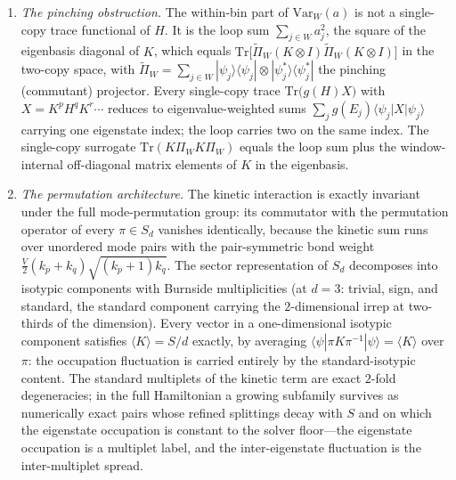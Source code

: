 \begin{proposition}
\begin{enumerate}[leftmargin=1.6em]
and $\mathrm{Var}_{W}(a)$ dominates its between-bin part
$\mathrm{Var}_{\mathrm{bins}}\bigl(\bar a_b\bigr)$, which is itself a
trace functional (per-bin window masses and first moments).
\item \emph{The pinching obstruction.} The within-bin part of
$\mathrm{Var}_{W}(a)$ is not a single-copy trace functional of $H$. It is
the loop sum $\sum_{j\in W}a_j^{2}$, the square of the eigenbasis diagonal
of $K$, which equals
$\mathrm{Tr}\bigl[\widetilde{\Pi}_{W}(K\otimes I)\widetilde{\Pi}_{W}
(K\otimes I)\bigr]$ in the two-copy space, with
$\widetilde{\Pi}_{W}=\sum_{j\in W}|\psi_j\rangle\langle\psi_j|\otimes
|\psi_j^{*}\rangle\langle\psi_j^{*}|$ the pinching (commutant) projector.
Every single-copy trace $\mathrm{Tr}\bigl(g(H)X\bigr)$ with
$X=K^{p}H^{q}K^{r}\cdots$ reduces to eigenvalue-weighted sums
$\sum_j g(E_j)\langle\psi_j|X|\psi_j\rangle$ carrying one eigenstate
index; the loop carries two on the same index. The single-copy surrogate
$\mathrm{Tr}(K\Pi_WK\Pi_W)$ equals the loop sum plus the window-internal
off-diagonal matrix elements of $K$ in the eigenbasis.
\item \emph{The permutation architecture.} The kinetic interaction is
exactly invariant under the full mode-permutation group: its commutator
with the permutation operator of every $\pi\in S_d$ vanishes identically,
because the kinetic sum runs over unordered mode pairs with the
pair-symmetric bond weight $\tfrac{V}{2}(k_p+k_q)\sqrt{(k_p+1)k_q}$. The
sector representation of $S_d$ decomposes into isotypic components with
Burnside multiplicities (at $d=3$: trivial, sign, and standard, the
standard component carrying the $2$-dimensional irrep at
two-thirds of the dimension). Every vector in a one-dimensional isotypic
component satisfies $\langle K\rangle=S/d$ exactly, by averaging
$\langle\psi|\pi K\pi^{-1}|\psi\rangle=\langle K\rangle$ over $\pi$: the
occupation fluctuation is carried entirely by the standard-isotypic
content. The standard multiplets of the kinetic term are exact
$2$-fold degeneracies; in the full Hamiltonian a growing subfamily
survives as numerically exact pairs whose refined splittings decay with
$S$ and on which the eigenstate occupation is constant to the solver
floor---the eigenstate occupation is a multiplet label, and the
inter-eigenstate fluctuation is the inter-multiplet spread.
\end{enumerate}
\end{proposition}


